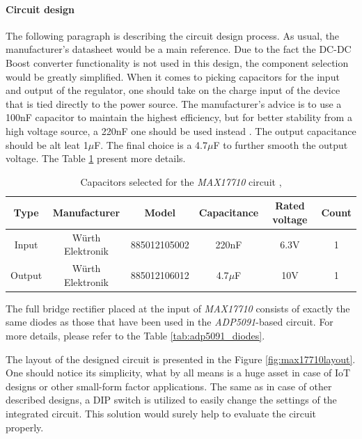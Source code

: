 \documentclass[12pt,a4paper]{article}
\begin{document}
\paragraph{Circuit design}
The following paragraph is describing the circuit design process. As usual, the manufacturer's datasheet \cite{max17710_params} would be a main reference. Due to the fact the DC-DC Boost converter functionality is not used in this design, the component selection would be greatly simplified. When it comes to picking capacitors for the input and output of the regulator, one should take on the charge input of the device that is tied directly to the power source. The manufacturer's advice is to use a 100nF capacitor to maintain the highest efficiency, but for better stability from a high voltage source, a 220nF one should be used instead \cite{max17710_params}. The output capacitance should be alt leat 1$\mu$F. The final choice is a 4.7$\mu$F to further smooth the output voltage. The Table \ref{tab:max17710_capacitors} present more details. 
\begin{table}[ht!]
\begin{tabular}{|c|c|c|c|c|c|}
\hline
 \textbf{Type} & \textbf{Manufacturer} & \textbf{Model} & \textbf{Capacitance} & \textbf{Rated voltage} & \textbf{Count}	\\ \hline
Input & Würth Elektronik & 885012105002  & 220nF & 6.3V & 1      \\ \hline
Output & Würth Elektronik & 885012106012  & 4.7$\mu$F & 10V & 1      \\ \hline
\end{tabular}
\caption{Capacitors selected for the \textit{MAX17710} circuit \cite{max17710_inputcapacitor}, \cite{max17710_outputcapacitor}}
\label{tab:max17710_capacitors}
\end{table}
\par
The full bridge rectifier placed at the input of \textit{MAX17710} consists of exactly the same diodes as those that have been used in the \textit{ADP5091}-based circuit. For more details, please refer to the Table \ref{tab:adp5091_diodes}.
\par

The layout of the designed circuit is presented in the Figure \ref{fig:max17710layout}. One should notice its simplicity, what by all means is a huge asset in case of IoT designs or other small-form factor applications. The same as in case of other described designs, a DIP switch is utilized to easily change the settings of the integrated circuit. This solution would surely help to evaluate the circuit properly.
\end{document}

